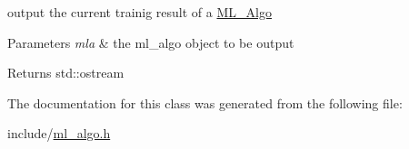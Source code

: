 output the current trainig result of a \hyperlink{classML__Algo}{M\+L\+\_\+\+Algo} 


\begin{DoxyParams}{Parameters}
{\em mla} & the ml\+\_\+algo object to be output \\
\hline
\end{DoxyParams}
\begin{DoxyReturn}{Returns}
std\+::ostream 
\end{DoxyReturn}


The documentation for this class was generated from the following file\+:\begin{DoxyCompactItemize}
\item 
include/\hyperlink{ml__algo_8h}{ml\+\_\+algo.\+h}\end{DoxyCompactItemize}
